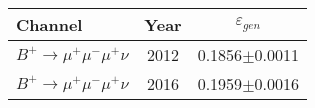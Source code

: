         \begin{table}[H]
                \begin{center}
        \begin{tabular}{l c c }

                Channel & Year & $\varepsilon_{gen}$\\ \hline
                $B^{+} \rightarrow \mu^{+} \mu^{-} \mu^{+} \nu$ & 2012 & 0.1856$\pm$0.0011 \\
                $B^{+} \rightarrow \mu^{+} \mu^{-} \mu^{+} \nu$ & 2016 & 0.1959$\pm$0.0016 \\ \hline


\end{tabular}
\end{center}
\end{table}
